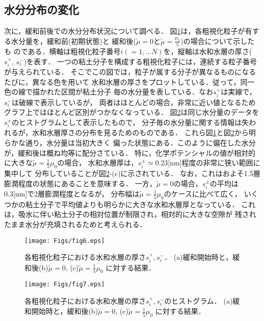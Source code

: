 \subsection{水分分布の変化}
次に，緩和前後での水分分布状況について調べる．
図\ref{fig:fig6}は，各粗視化粒子が有する水分量を，緩和前(初期状態)と
緩和後($\tilde \mu=0$と$\tilde \mu =\frac{\mu_0}{5}$)の場合について示したも
のである．横軸は粗視化粒子番号$i(=1,\dots N)$を，縦軸は水和水層の厚さ($s_i^+,\, s_i^-$)を表す．
一つの粘土分子を構成する粗視化粒子には，連続する粒子番号が与えられている．
そこでこの図では，粒子が属する分子が異なるものになるたびに，異なる色を用いて
水和水層の厚さをプロットしている．従って，同一色の線で描かれた区間が粘土分子
毎の水分量を表している．なお$s^+_i$は実線で，$s^-_i$は破線で表示しているが，
両者はほとんどの場合，非常に近い値となるためグラフ上ではほとんど区別がつかなくなっている．
図\ref{fig:fig7}は同じ水分量のデータを$s^\pm_i$のヒストグラムとして表示したもので，
分子毎の水分量に関する情報は失われるが，水和水層厚さの分布を見るためのものである．
これら図\ref{fig:fig6}と図\ref{fig:fig7}から明らかな通り，水分量は当初大きく
偏った状態にある．このように偏在した水分が，緩和後は概ね均等に配分さている．
特に，化学ポテンシャルの値が相対的に大きな$\tilde \mu= \frac{1}{5}\mu_0$の場合，
水和水層厚は，$s^{\pm}_i\simeq 0.23$[nm]程度の非常に狭い範囲に集中して
分布していることが図\ref{fig:fig7}-(c)に示されている．
なお，これはおよそ1.5層膨潤程度の状態にあることを意味する．
一方，$\tilde \mu=0$の場合，$s^\pm_i$の平均は0.3[nm]で2層膨潤程度となるが，
分布幅は$\tilde \mu =\frac{1}{5}\mu_0$のケースに比べて広く，
いくつかの粘土分子で平均値よりも明らかに大きな水和水層厚となっている．
これは，吸水に伴い粘土分子の相対位置が制限され，相対的に大きな空隙が
残されたまま水分が充填されるためと考えられる．
\begin{figure}[h]
	\begin{center}
	\texttt{[image: Figs/fig6.eps]} 
	\end{center}
	\caption{
		各粗視化粒子における水和水層の厚さ$s_i^+,s_i^-$．
		(a)緩和開始時と，緩和後(b)$\tilde \mu=0$, (c)$\tilde \mu =\frac{1}{5}\mu_0$
		に対する結果．
	} 
	\label{fig:fig6}
\end{figure}
\begin{figure}[h]
	\begin{center}
	\texttt{[image: Figs/fig7.eps]} 
	\end{center}
	\caption{
		各粗視化粒子における水和水層の厚さ$s_i^+,s_i^-$のヒストグラム．
		(a)緩和開始時と，緩和後(b)$\tilde \mu=0$, (c)$\tilde \mu =\frac{1}{5}\mu_0$
		に対する結果．
	} 
	\label{fig:fig7}
\end{figure}
